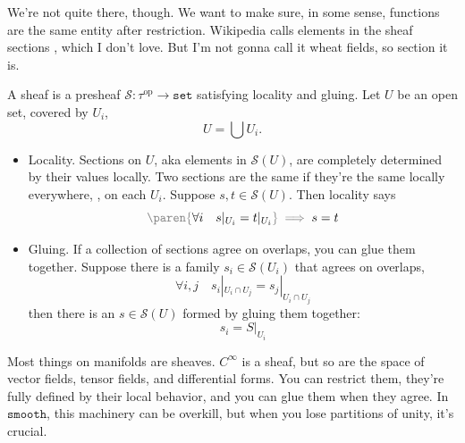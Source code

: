 \documentclass[a5paper]{scrartcl}
\def\setcat{\texttt{set}}
\def\smooth{\texttt{smooth}}
\newcommand{\gray}[1]{{\color{gray}#1}}
\newcommand{\black}[1]{{\color{black}#1}}
\newcommand{\gparen}[1]{\left .\!{\gray{\paren{\black{#1}}}}\!\right.}
\newcommand{\op}{\textrm{op}}
\let\oldimplies\implies
\def\implies{\color{gray}\oldimplies\color{black}}
\begin{document}
We're not quite there, though. We want to make sure, in some sense, functions are the same entity after restriction. Wikipedia calls elements in the sheaf sections \cite{wiki-sheaf}, which I don't love. But I'm not gonna call it wheat fields, so section it is.
\begin{defn}[Sheaf]
  \def\S{\mathcal S}
  A sheaf is a presheaf \(\S:\tau^{\op}\to \setcat\) satisfying locality and gluing. Let \(U\) be an open set, covered by \(U_i\),
  \[
    U= \bigcup U_i.
  \]
  \begin{itemize}
    \item Locality. Sections on \(U\), aka elements in \(\S(U)\), are completely determined by their values locally. Two sections are the same if they're the same locally everywhere, \ie, on each \(U_i\). Suppose \(s,t\in \S(U)\). Then locality says
          \[
          \gparen{\forall i \quad s|_{U_i} = t|_{U_i} } \implies s = t
          \]

    \item Gluing. If a collection of sections agree on overlaps, you can glue them together. Suppose there is a family \(s_i\in \S(U_i)\) that agrees on overlaps,
          \[
          \forall i,j \quad { s_i|_{U_i \cap U_j} = s_j|_{U_i\cap U_j} }
          \]
          then there is an \(s\in \S(U)\) formed by gluing them together:
          \[
          s_i = S|_{U_i}
          \]
  \end{itemize}
  \cite{wiki-sheaf}
\end{defn}
Most things on manifolds are sheaves. \(C^\infty\) is a sheaf, but so are the space of vector fields, tensor fields, and differential forms. You can restrict them, they're fully defined by their local behavior, and you can glue them when they agree. In \(\smooth\), this machinery can be overkill, but when you lose partitions of unity, it's crucial.
\end{document}
